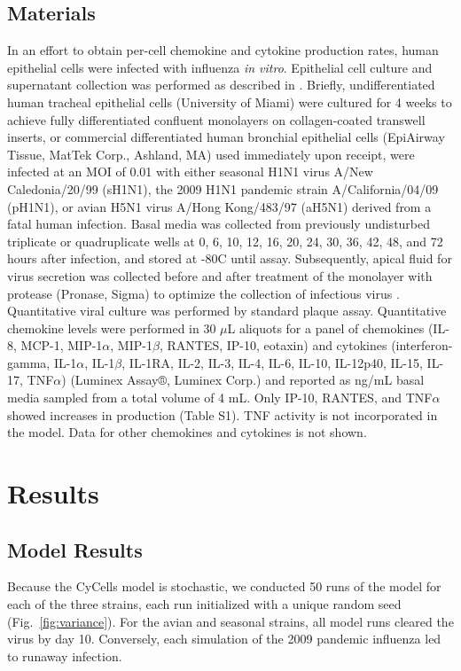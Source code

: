 \documentclass[10pt]{article}
\begin{document}
\subsection*{Materials}

In an effort to obtain per-cell chemokine and cytokine production rates, human epithelial cells were infected with influenza \textit{in vitro}.  Epithelial cell culture and supernatant collection was performed as described in \cite{Mitchell2011}.  Briefly, undifferentiated human tracheal epithelial cells (University of Miami) were cultured for 4 weeks to achieve fully differentiated confluent monolayers on collagen-coated transwell inserts, or commercial differentiated human bronchial epithelial cells (EpiAirway Tissue, MatTek Corp., Ashland, MA) used immediately upon receipt, were infected at an MOI of 0.01 with either seasonal H1N1 virus A/New Caledonia/20/99 (sH1N1), the 2009 H1N1 pandemic strain A/California/04/09 (pH1N1), or avian H5N1 virus A/Hong Kong/483/97 (aH5N1) derived from a fatal human infection.  Basal media was collected from previously undisturbed triplicate or quadruplicate wells at 0, 6, 10, 12, 16, 20, 24, 30, 36, 42, 48, and 72 hours after infection, and stored at -80C until assay.  Subsequently, apical fluid for virus secretion was collected before and after treatment of the monolayer with protease (Pronase, Sigma) to optimize the collection of infectious virus \cite{Mitchell2011}.  Quantitative viral culture was performed by standard plaque assay.  Quantitative chemokine levels were performed in 30 $\mu$L aliquots for a panel of chemokines (IL-8, MCP-1, MIP-1$\alpha$, MIP-1$\beta$, RANTES, IP-10, eotaxin) and cytokines (interferon-gamma, IL-1$\alpha$, IL-1$\beta$, IL-1RA, IL-2, IL-3, IL-4, IL-6, IL-10, IL-12p40, IL-15, IL-17, TNF$\alpha$) (Luminex Assay®, Luminex Corp.) and reported as ng/mL basal media sampled from a total volume of 4 mL.  Only IP-10, RANTES, and TNF$\alpha$ showed increases in production (Table S1).  TNF activity is not incorporated in the model.  Data for other chemokines and cytokines is not shown.


\section*{Results}

\subsection*{Model Results}

Because the CyCells model is stochastic, we conducted 50 runs of the model for each of the three strains, each run initialized with a unique random seed (Fig.~\ref{fig:variance}).  For the avian and seasonal strains, all model runs cleared the virus by day 10.  Conversely, each simulation of the 2009 pandemic influenza led to runaway infection.
\end{document}
